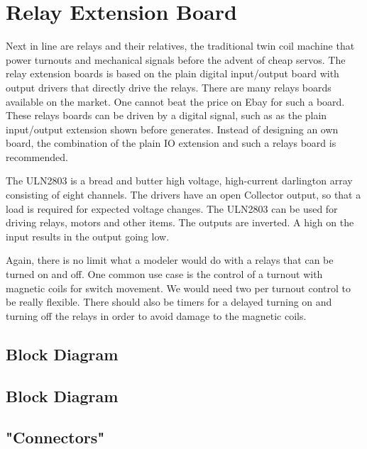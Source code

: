 \chapter{Relay Extension Board}

Next in line are relays and their relatives, the traditional twin coil machine that power turnouts and mechanical signals before the advent of cheap servos. The relay extension boards is based on the plain digital input/output board with output drivers that directly drive the relays. There are many relays boards available on the market. One cannot beat the price on Ebay for such a board. These relays boards can be driven by a digital signal, such as as the plain input/output extension shown before generates. Instead of designing an own board, the combination of the plain IO extension and such a relays board is recommended.

The ULN2803 is a bread and butter high voltage, high-current darlington array consisting of eight channels. The drivers have an open Collector output, so that a load is required for expected voltage changes. The ULN2803 can be used for driving relays, motors and other items. The outputs are inverted. A high on the input results in the output going low.


Again, there is no limit what a modeler would do with a relays that can be turned on and off. One common use case is the control of a turnout with magnetic coils for switch movement. We would need two per turnout control to be really flexible. There should also be timers for a delayed turning on and turning off the relays in order to avoid damage to the magnetic coils.

\section{Block Diagram}

\section{Block Diagram}


\section{"Connectors"}


